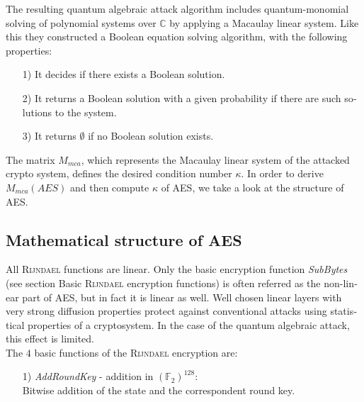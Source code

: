\documentclass[a4paper,11pt]{article}
\begin{document}
\begin{otherlanguage}{english}
\noindent
The resulting quantum algebraic attack algorithm includes quantum-monomial solving of polynomial systems over $\mathbb{C}$ by applying a Macaulay linear system. Like this they constructed a Boolean equation solving algorithm, with the following properties: \\

\begin{itemize} [noitemsep, nolistsep]
  \item[1)] It decides if there exists a Boolean solution.
  \vspace{0.1cm}
  \item[2)] It returns a Boolean solution with a given probability if there are such solutions to the system.
  \vspace{0.1cm}
  \item[3)] It returns $\emptyset$ if no Boolean solution exists.
\end{itemize}
\vspace{0.5cm}

\noindent
The matrix $M_{mca}$, which represents the Macaulay linear system of the attacked crypto system, defines the desired condition number $\kappa$. In order to derive $M_{mca}(AES)$ and then compute $\kappa$ of \textsc{AES}, we take a look at the structure of \textsc{AES}.


\subsection{Mathematical structure of \textsc{AES}}
\noindent
All \textsc{Rijndael} functions are linear. Only the basic encryption function \textit{SubBytes} (see section Basic \textsc{Rijndael} encryption functions) is often referred as the non-linear part of \textsc{AES}, but in fact it is linear as well. Well chosen linear layers with very strong diffusion properties protect against conventional attacks using statistical properties of a cryptosystem. In the case of the quantum algebraic attack, this effect is limited. \\


The $4$ basic functions of the \textsc{Rijndael} encryption are: \\

\begin{itemize} [noitemsep, nolistsep]
  \item[1)] \textit{AddRoundKey} - addition in ${(\mathbb{F}_2)}^{128}$: \\ 
  Bitwise addition of the state and the correspondent round key.
  \vspace{0.1cm}


\end{itemize}
\end{otherlanguage}
\end{document}
